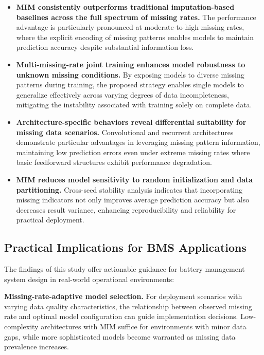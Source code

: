 \documentclass[5p,times]{elsarticle}
\begin{document}
\begin{itemize}
    \item \textbf{MIM consistently outperforms traditional imputation-based baselines across the full spectrum of missing rates.} The performance advantage is particularly pronounced at moderate-to-high missing rates, where the explicit encoding of missing patterns enables models to maintain prediction accuracy despite substantial information loss.
    
    \item \textbf{Multi-missing-rate joint training enhances model robustness to unknown missing conditions.} By exposing models to diverse missing patterns during training, the proposed strategy enables single models to generalize effectively across varying degrees of data incompleteness, mitigating the instability associated with training solely on complete data.
    
    \item \textbf{Architecture-specific behaviors reveal differential suitability for missing data scenarios.} Convolutional and recurrent architectures demonstrate particular advantages in leveraging missing pattern information, maintaining low prediction errors even under extreme missing rates where basic feedforward structures exhibit performance degradation.
    
    \item \textbf{MIM reduces model sensitivity to random initialization and data partitioning.} Cross-seed stability analysis indicates that incorporating missing indicators not only improves average prediction accuracy but also decreases result variance, enhancing reproducibility and reliability for practical deployment.
\end{itemize}

\subsection{Practical Implications for BMS Applications}\label{sec:implications}

The findings of this study offer actionable guidance for battery management system design in real-world operational environments:

\textbf{Missing-rate-adaptive model selection.} For deployment scenarios with varying data quality characteristics, the relationship between observed missing rate and optimal model configuration can guide implementation decisions. Low-complexity architectures with MIM suffice for environments with minor data gaps, while more sophisticated models become warranted as missing data prevalence increases.
\end{document}
